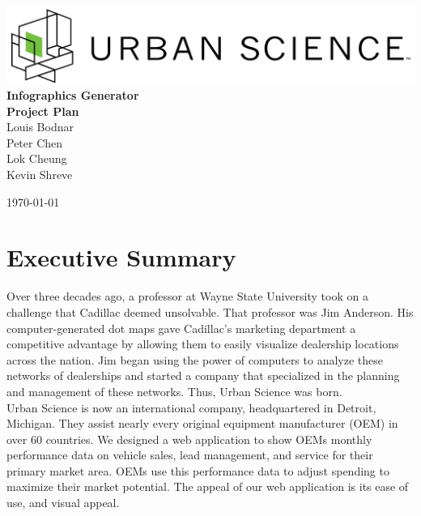 \documentclass[11pt,a4paper,oneside]{article}
\begin{document}
\begin{titlepage}



\begin{center}

\includegraphics[width=1\textwidth]{images/sponsor-logo.png}\\[1cm]    

{ \huge \bfseries Infographics Generator}\\[0.4cm]
{ \large \bfseries Project Plan}\\[0.4cm]

Louis Bodnar\\
Peter Chen\\
Lok Cheung\\
Kevin Shreve\\


\vfill

{\large \today}

\end{center}

\end{titlepage}

\tableofcontents
\newpage
\section{Executive Summary}
Over three decades ago, a professor at Wayne State University took on a challenge that Cadillac deemed unsolvable. That professor was Jim Anderson. His computer-generated dot maps gave Cadillac's marketing department a competitive advantage by allowing them to easily visualize dealership locations across the nation. Jim began using the power of computers to analyze these networks of dealerships and started a company that specialized in the planning and management of these networks. Thus, Urban Science was born.\\

Urban Science is now an international company, headquartered in Detroit, Michigan. They assist nearly every original equipment manufacturer (OEM) in over 60 countries. We designed a web application to show OEMs monthly performance data on vehicle sales, lead management, and service for their primary market area. OEMs use this performance data to adjust spending to maximize their market potential. The appeal of our web application is its ease of use, and visual appeal.\\
\end{document}
